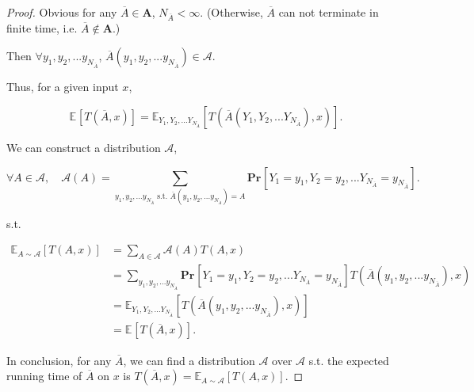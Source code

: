 \documentclass{article}
\newcommand{\staExp}[2]{\mathbb{E}_{#1}\left[#2\right]}
\renewcommand{\Pr}[2]{\mathbf{Pr}_{#1}\left[#2\right]}
\begin{document}
\begin{proof}
    \hspace{1.3em}
    Obvious for any $\overline{A}\in\mathbf{A}$, $N_{\overline{A}}<\infty$. 
    (Otherwise, $\overline{A}$ can not terminate in finite time, i.e. $\overline{A}\notin\mathbf{A}.$)
    
    \hspace{1.3em}
    Then $\forall y_1,y_2,...y_{N_{\overline{A}}}$, $\overline{A}(y_1,y_2,...y_{N_{\overline{A}}})\in\mathcal{A}$.
    
    \hspace{1.3em}
    Thus, for a given input $x$,
    
    \vspace{-1.3em}
    $$\staExp{}{T(\overline{A},x)}=\staExp{Y_1,Y_2,...Y_{N_{\overline{A}}}}{T\left(\overline{A}\left(Y_1,Y_2,...Y_{N_{\overline{A}}}\right),x\right)}.$$
    
    \vspace{-0.5em} \hspace{1.3em}
    We can construct a distribution $\mathscr{A}$,
    
    \vspace{-2em}
    $$\forall A\in\mathcal{A},\quad\mathscr{A}(A)=\sum_{y_1,y_2,...y_{N_{\overline{A}}}\text{ s.t. }\overline{A}(y_1,y_2,...y_{N_{\overline{A}}})=A}\Pr{}{Y_1=y_1,Y_2=y_2,...Y_{N_{\overline{A}}}=y_{N_{\overline{A}}}}.$$
    
    \vspace{-1.2em} \hspace{1.5em}
    s.t.
    
    \vspace{-2.5em}
    \begin{align*}
        \staExp{A\sim\mathscr{A}}{T(A,x)} &= \sum_{A\in\mathcal{A}}\mathscr{A}(A)T(A,x) \\ &=\sum_{y_1,y_2,...y_{N_{\overline{A}}}}\Pr{}{Y_1=y_1,Y_2=y_2,...Y_{N_{\overline{A}}}=y_{N_{\overline{A}}}}T(\overline{A}(y_1,y_2,...y_{N_{\overline{A}}}),x)\\
        &=\staExp{Y_1,Y_2,...Y_{N_{\overline{A}}}}{T\left(\overline{A}\left(y_1,y_2,...y_{N_{\overline{A}}}\right),x\right)} \\
        &=\staExp{}{T(\overline{A},x)}.
    \end{align*}
    
    \hspace{1.3em}
    In conclusion, for any $\overline{A}$, we can find a distribution $\mathscr{A}$ over $\mathcal{A}$ s.t. the expected running time of $\overline{A}$ on $x$ is $T(\overline{A},x)=\staExp{A\sim\mathscr{A}}{T(A,x)}.$
    

\end{proof}
\end{document}
